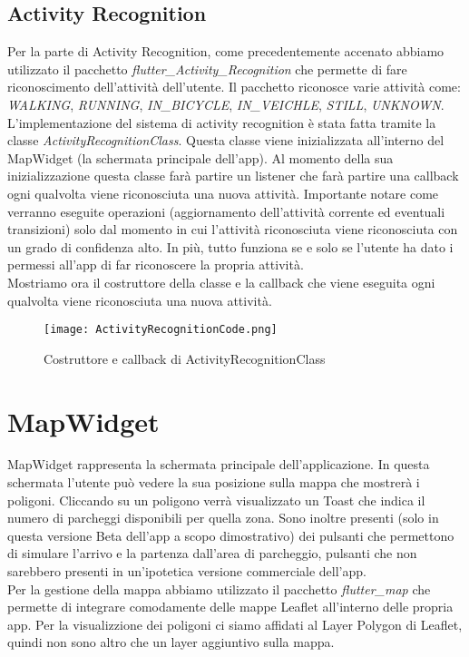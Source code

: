 \documentclass[../../Report.tex]{subfiles}
\begin{document}
\subsection{Activity Recognition}
Per la parte di Activity Recognition, come precedentemente accenato abbiamo utilizzato il pacchetto \emph{flutter\_Activity\_Recognition} che permette di fare riconoscimento dell'attività dell'utente. Il pacchetto riconosce varie attività come: \emph{WALKING}, \emph{RUNNING}, \emph{IN\_BICYCLE}, \emph{IN\_VEICHLE}, \emph{STILL}, \emph{UNKNOWN}. L'implementazione del sistema di activity recognition è stata fatta tramite la classe \emph{ActivityRecognitionClass}. Questa classe viene inizializzata all'interno del MapWidget (la schermata principale dell'app). Al momento della sua inizializzazione questa classe farà partire un listener che farà partire una callback ogni qualvolta viene riconosciuta una nuova attività. Importante notare come verranno eseguite operazioni (aggiornamento dell'attività corrente ed eventuali transizioni) solo dal momento in cui l'attività riconosciuta viene riconosciuta con un grado di confidenza alto. In più, tutto funziona se e solo se l'utente ha dato i permessi all'app di far riconoscere la propria attività.\\
Mostriamo ora il costruttore della classe e la callback che viene eseguita ogni qualvolta viene riconosciuta una nuova attività.\\
\begin{figure}[H]
  \centering
  \texttt{[image: ActivityRecognitionCode.png]}
  \caption{Costruttore e callback di ActivityRecognitionClass}
  \end{figure}

\section{MapWidget}
MapWidget rappresenta la schermata principale dell'applicazione. In questa schermata l'utente può vedere la sua posizione sulla mappa che mostrerà i poligoni. Cliccando su un poligono verrà visualizzato un Toast che indica il numero di parcheggi disponibili per quella zona. Sono inoltre presenti (solo in questa versione Beta dell'app a scopo dimostrativo) dei pulsanti che permettono di simulare l'arrivo e la partenza dall'area di parcheggio, pulsanti che non sarebbero presenti in un'ipotetica versione commerciale dell'app. \\ 
Per la gestione della mappa abbiamo utilizzato il pacchetto \emph{flutter\_map} che permette di integrare comodamente delle mappe Leaflet all'interno delle propria app. Per la visualizzione dei poligoni ci siamo affidati al Layer Polygon di Leaflet, quindi non sono altro che un layer aggiuntivo sulla mappa.\\ 
\end{document}
